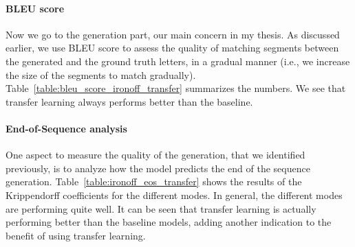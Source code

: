 
    \paragraph{BLEU score}
      Now we go to the generation part, our main concern in my thesis. As discussed earlier, we use BLEU score to assess the quality of matching segments between the generated and the ground truth letters, in a gradual manner (i.e., we increase the size of the segments to match gradually). Table~\ref{table:bleu_score_ironoff_transfer} summarizes the numbers. We see that transfer learning always performs better than the baseline.
    \paragraph{End-of-Sequence analysis}
    One aspect to measure the quality of the generation, that we identified previously, is to analyze how the model predicts the end of the sequence generation. Table~\ref{table:ironoff_eos_transfer} shows the results of the Krippendorff coefficients for the different modes. In general, the different modes are performing quite well. It can be seen that transfer learning is actually performing better than the baseline models, adding another indication to the benefit of using transfer learning.

